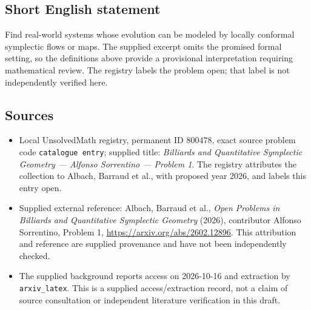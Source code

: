 \documentclass[11pt]{article}
\begin{document}
\subsection{Short English statement}
Find real-world systems whose evolution can be modeled by locally conformal symplectic flows or maps. The supplied excerpt omits the promised formal setting, so the definitions above provide a provisional interpretation requiring mathematical review. The registry labels the problem open; that label is not independently verified here.
\subsection{Sources}
\begin{itemize}
\item Local UnsolvedMath registry, permanent ID \(800478\), exact source problem code \texttt{catalogue entry}; supplied title: \emph{Billiards and Quantitative Symplectic Geometry --- Alfonso Sorrentino --- Problem 1}. The registry attributes the collection to Albach, Barraud et al., with proposed year 2026, and labels this entry open.
\item Supplied external reference: Albach, Barraud et al., \emph{Open Problems in Billiards and Quantitative Symplectic Geometry} (2026), contributor Alfonso Sorrentino, Problem 1, \url{https://arxiv.org/abs/2602.12896}. This attribution and reference are supplied provenance and have not been independently checked.
\item The supplied background reports access on 2026-10-16 and extraction by \texttt{arxiv\_latex}. This is a supplied access/extraction record, not a claim of source consultation or independent literature verification in this draft.
\end{itemize}
\end{document}
